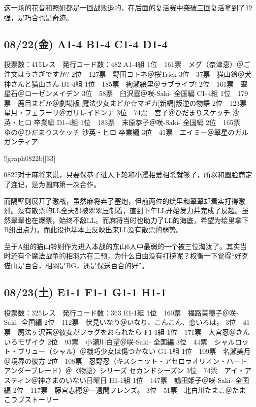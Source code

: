 这一场的花音和照姐都是一回战败退的，在后面的复活赛中突破三回复活拿到了32强，是巧合也是奇迹。

\subsection{08/22(金) A1-4 B1-4 C1-4 D1-4}

	投票数：415レス　発行コード数：482
	A1-4組
	1位　161票　メグ（奈津恵）＠ご注文はうさぎですか?
	2位　127票　野田コトネ＠桜Trick
	3位　37票　猫山鈴＠犬神さんと猫山さん
	B1-4組
	1位　185票　絢瀬絵里＠ラブライブ!
	2位　161票　翠星石＠ローゼンメイデン
	3位　58票　臼沢塞＠咲-Saki- 全国編
	C1-4組
	1位　179票　鹿目まどか＠劇場版 魔法少女まどか☆マギカ[新編]叛逆の物語
	2位　123票　星月・フェラーリ＠ガリレイドンナ
	3位　74票　宮子＠ひだまりスケッチ 沙英・ヒロ 卒業編
	D1-4組
	1位　183票　末原恭子＠咲-Saki- 全国編
	2位　165票　ゆの＠ひだまりスケッチ 沙英・ヒロ 卒業編
	3位　41票　エイミー＠翠星のガルガンティア

![graph0822b][33]

0822对于麻将来说，只要保恭子进入下轮和小漫相爱相杀就够了，所以和圆脸商定了连记，是为圆麻第一次合作。

而隔壁则展开了激战，虽然麻将弃了塞炮，但前两位的绘里和翠翠却着实打得激烈。没有散票的LL全天都被翠翠压制着，直到下午LL开始发力并完成了反超。虽然翠翠也在爆票，始终不敌LL。而麻将当时也助力了LL的海底，希望为绘里拿下B组出点力。而此役也基本上反映出来LL没有散票的弱势。

至于A组的猫山铃则作为进入本战的东山6人中最弱的一个被三位淘汰了。其实当时还有个魔法战争的相羽六在二预，为什么自由没有打捞呢？权衡一下觉得“好歹猫山是百合，相羽是BG，还是保送百合的好”。

\subsection{08/23(土) E1-1 F1-1 G1-1 H1-1}

	投票数：325レス　発行コード数：363
	E1-1組
	1位　160票　福路美穂子＠咲-Saki- 全国編
	2位　112票　伏見いなり＠いなり、こんこん、恋いろは。
	3位　41票　魔法ヶ沢茜＠彼女がフラグをおられたら
	F1-1組
	1位　171票　大宮忍＠きんいろモザイク
	2位　93票　小瀬川白望＠咲-Saki- 全国編
	3位　44票　シャルロット・ブリュー（シャル）＠機巧少女は傷つかない
	G1-1組
	1位　109票　名瀬美月＠境界の彼方
	2位　108票　忍野忍（キスショット・アセロラオリオン・ハートアンダーブレード）＠〈物語〉シリーズ セカンドシーズン
	3位　74票　アイ・アスティン＠神さまのいない日曜日
	H1-1組
	1位　147票　鶴田姫子＠咲-Saki- 全国編
	2位　117票　藤宮志穂＠一週間フレンズ。
	3位　51票　北白川たまこ＠たまこラブストーリー

